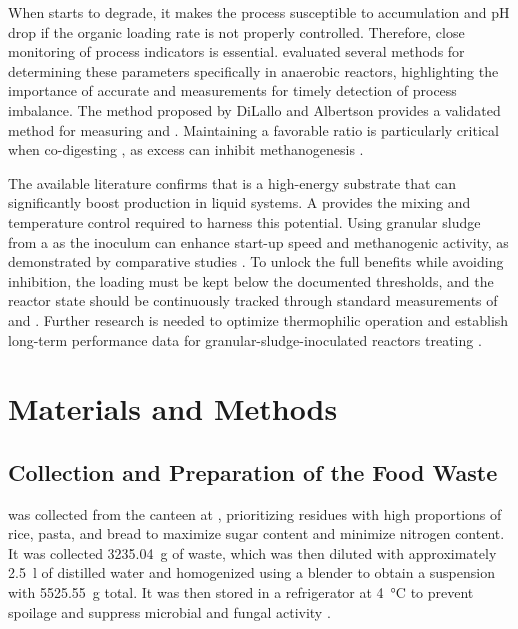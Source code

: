 \documentclass[12pt, a4paper, oneside]{report}
\begin{document}
When  starts to degrade, it makes the  process susceptible to  accumulation and pH drop if the organic loading rate is not properly controlled. Therefore, close monitoring of process indicators is essential. \textcite{ribas2007} evaluated several methods for determining these parameters specifically in anaerobic reactors, highlighting the importance of accurate  and  measurements for timely detection of process imbalance. The method proposed by DiLallo and Albertson  provides a validated method for measuring  and . Maintaining a favorable  ratio is particularly critical when co-digesting , as excess  can inhibit methanogenesis \parencite{tomczak2025}.

The available literature confirms that  is a high-energy substrate that can significantly boost  production in liquid  systems. A  provides the mixing and temperature control required to harness this potential. Using granular sludge from a  as the inoculum can enhance start-up speed and methanogenic activity, as demonstrated by comparative studies \parencite{posmanik2020, li2011}. To unlock the full benefits while avoiding inhibition, the  loading must be kept below the documented thresholds, and the reactor state should be continuously tracked through standard measurements of  and . Further research is needed to optimize thermophilic  operation and establish long-term performance data for granular-sludge-inoculated reactors treating .
\clearpage{}
\clearpage{}\chapter{Materials and Methods}
\label{ch:materials_methods}

\section{Collection and Preparation of the Food Waste}
\label{sec:col_prep_FW}

 was collected from the canteen at , prioritizing residues with high proportions of rice, pasta, and bread to maximize sugar content and minimize nitrogen content. It was collected \qty[round-mode = places, round-precision = 0]{3235.04}{\gram} of waste, which was then diluted with approximately \qty{2.5}{\litre} of distilled water and homogenized using a blender to obtain a  suspension with \qty[round-mode = places, round-precision = 0]{5525.55}{\gram} total. It was then stored in a refrigerator at \qty{4}{\celsius} to prevent spoilage and suppress microbial and fungal activity \parencite{degueurce2020}.
\end{document}
